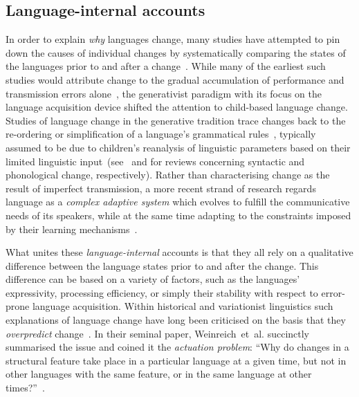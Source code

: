 \subsection{Language-internal accounts}

In order to explain \emph{why} languages change, many studies have attempted to pin down the causes of individual changes by systematically comparing the states of the languages prior to and after a change~\citep{Hockett1965,McMahon1994}. While many of the earliest such studies would attribute change to the gradual accumulation of performance and transmission errors alone~\citep[e.g.][]{Jespersen1922,Hockett1958}, the generativist paradigm with its focus on the language acquisition device shifted the attention to child-based language change. Studies of language change in the generative tradition trace changes back to the re-ordering or simplification of a language's grammatical rules~\citep{Kiparsky1968,Wang1969,Bailey1973,Lass1980,Vennemann1983}, 
typically assumed to be due to children's reanalysis of linguistic parameters based on their limited linguistic input~(see~\citet{Kroch2001} and \citet{Foulkes2013} for reviews concerning syntactic and phonological change, respectively).
Rather than characterising change as the result of imperfect transmission, a more recent strand of research regards language as a \emph{complex adaptive system} which evolves to fulfill the communicative needs of its speakers, while at the same time adapting to the constraints imposed by their learning mechanisms~\citep{Kirby1999,Steels2000,Griffiths2007,LCAS2009}.

What unites these \emph{language-internal} accounts is that they all rely on a qualitative difference between the language states prior to and after the change. This difference can be based on a variety of factors, such as the languages' expressivity, processing efficiency, or simply their stability with respect to error-prone language acquisition. Within historical and variationist linguistics such explanations of language change have long been criticised on the basis that they \emph{overpredict} change~\citep{Saussure1959,Greenberg1959,Weinreich1968,Lass1980,Ohala1989,Croft2000,Labov2001,Winter-Froemel2008}. In their seminal paper, Weinreich~et~al. succinctly summarised the issue and coined it the \emph{actuation problem}: ``Why do changes in a structural feature take place in a particular language at a given time, but not in other languages with the same feature, or in the same language at other times?''~\citep[p.102]{Weinreich1968}.

